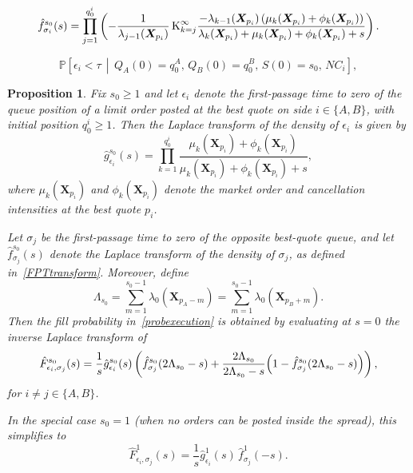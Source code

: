 \documentclass[10pt,a4paper]{amsart}
\newtheorem{proposition}{Proposition}
\begin{document}
\begin{equation}\label{FPTtransform}
\hat{f}^{s_0}_{\sigma_i}(s)
=
\prod_{j=1}^{q_0^i}
\left(
-\frac{1}{\lambda_{j-1}(\boldsymbol{X}_{p_i})}
\,\text{\textup{\huge K}}_{k=j}^\infty
\frac{-\lambda_{k-1}(\boldsymbol{X}_{p_i})
\left(\mu_k(\boldsymbol{X}_{p_i})+\phi_k(\boldsymbol{X}_{p_i})\right)}
{\lambda_k(\boldsymbol{X}_{p_i})+\mu_k(\boldsymbol{X}_{p_i})+\phi_k(\boldsymbol{X}_{p_i})+s}
\right).
\end{equation}

\begin{equation}\label{probexecution}
\mathbb{P}\left[\epsilon_i < \tau \,\middle|\, Q_A(0) = q_0^A,\, Q_B(0) = q_0^B,\, S(0) = s_0,\, NC_i\right],
\end{equation}

\begin{proposition}\label{prop_fillprob}
Fix $s_0\geq 1$ and let $\epsilon_i$ denote the first-passage time to zero of the queue position of a limit order posted at the best quote on side $i\in\{A,B\}$, with initial position $q_0^i\geq 1$. Then the Laplace transform of the density of $\epsilon_i$ is given by
\begin{equation}\label{Laplacedeath}
\hat{g}_{\epsilon_i}^{s_0}(s)
=
\prod_{k=1}^{q_0^i}
\frac{\mu_k(\boldsymbol{X}_{p_i})+\phi_k(\boldsymbol{X}_{p_i})}
{\mu_k(\boldsymbol{X}_{p_i})+\phi_k(\boldsymbol{X}_{p_i})+s},
\end{equation}
where $\mu_k(\boldsymbol{X}_{p_i})$ and $\phi_k(\boldsymbol{X}_{p_i})$ denote the market order and cancellation intensities at the best quote $p_i$.

Let $\sigma_j$ be the first-passage time to zero of the opposite best-quote queue, and let $\hat{f}_{\sigma_j}^{s_0}(s)$ denote the Laplace transform of the density of $\sigma_j$, as defined in~\eqref{FPTtransform}. Moreover, define
\[
\Lambda_{s_0}
=
\sum_{m=1}^{s_0-1}\lambda_0(\boldsymbol{X}_{p_A-m})
=
\sum_{m=1}^{s_0-1}\lambda_0(\boldsymbol{X}_{p_B+m}).
\]
Then the fill probability in~\eqref{probexecution} is obtained by evaluating at $s=0$ the inverse Laplace transform of
\begin{equation}\label{LTexecution}
\hat{F}_{\epsilon_i,\sigma_j}^{s_0}(s)
=
\frac{1}{s}\hat{g}_{\epsilon_i}^{s_0}(s)
\left(
\hat{f}_{\sigma_j}^{s_0}(2\Lambda_{s_0}-s)
+
\frac{2\Lambda_{s_0}}{2\Lambda_{s_0}-s}
\Bigl(1-\hat{f}_{\sigma_j}^{s_0}(2\Lambda_{s_0}-s)\Bigr)
\right),
\end{equation}
for $i\neq j\in\{A,B\}$.

In the special case $s_0=1$ (when no orders can be posted inside the spread), this simplifies to
\begin{equation}
\hat{F}_{\epsilon_i,\sigma_j}^{1}(s)
=
\frac{1}{s}\hat{g}_{\epsilon_i}^{1}(s)\,
\hat{f}_{\sigma_j}^{1}(-s).
\end{equation}
\end{proposition}
\end{document}
